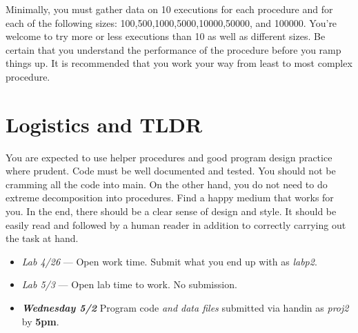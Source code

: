 \documentclass[]{tufte-handout}
\begin{document}
Minimally, you must gather data on 10 executions for each procedure and for each of the following sizes: 100,500,1000,5000,10000,50000, and 100000. You're welcome to try more or less executions than 10 as well as different sizes. Be certain that you understand the performance of the procedure before you ramp things up. It is recommended that you work your way from least to most complex procedure.

\section{Logistics and TLDR}

You are expected to use helper procedures and good program design practice where prudent. Code must be well documented and tested. You should not be cramming all the code into main. On the other hand, you do not need to do extreme decomposition into procedures.  Find a happy medium that works for you. In the end, there should be a clear sense of design and style. It should be easily read and followed by a human reader in addition to correctly carrying out the task at hand.

\begin{itemize}
\item \textit{Lab 4/26} --- Open work time. Submit what you end up with as \textit{labp2}.
\item \textit{Lab 5/3} --- Open lab time to work. No submission.
\item \textit{\textbf{Wednesday 5/2}} Program code \textit{and data files} submitted via handin as \textit{proj2} by \textbf{5pm}.
\end{itemize}
\end{document}

